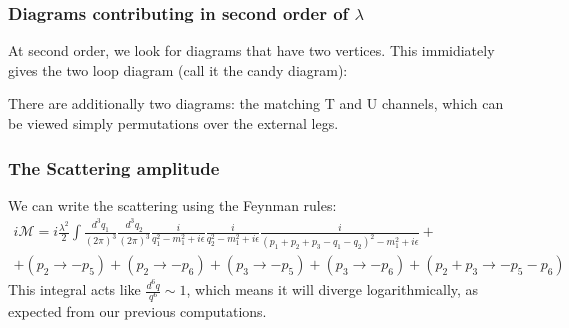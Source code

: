 \documentclass{article}
\begin{document}
\subsubsection{Diagrams contributing in second order of $\lambda$}
At second order, we look for diagrams that have two vertices. This immidiately gives the two loop diagram (call it the candy diagram):
\begin{center}
\end{center}
There are additionally two diagrams: the matching T and U channels, which can be viewed simply permutations over the external legs.
\subsubsection{The Scattering amplitude}
We can write the scattering using the Feynman rules:
\begin{equation}
\begin{gathered}
    i\mathcal{M} = i\frac{\lambda^2}{2}\int \frac{d^3q_1}{(2\pi)^3} \frac{d^3q_2}{(2\pi)^3}\frac{i}{q_1^2-m_1^2+i\epsilon}\frac{i}{q_2^2-m_1^2+i\epsilon}\frac{i}{(p_1 + p_2 + p_3 - q_1 - q_2)^2-m_1^2+i\epsilon} + \\ +
    (p_2 \rightarrow - p_5) +
    (p_2 \rightarrow - p_6) +
    (p_3 \rightarrow - p_5) +
    (p_3 \rightarrow - p_6) +
    (p_2 + p_3 \rightarrow -p_5 - p_6)
\end{gathered}
\end{equation}
This integral acts like $\frac{d^6q}{q^6} \sim 1$, which means it will diverge logarithmically, as expected from our previous computations.
\end{document}
